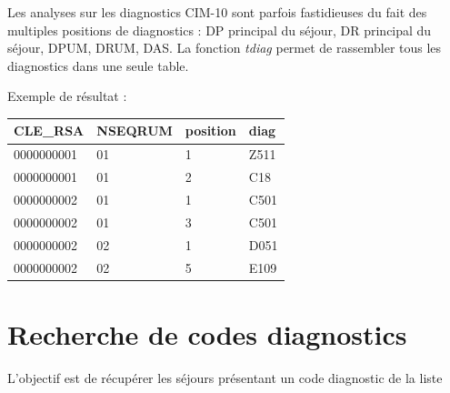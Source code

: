 \documentclass[]{book}
\newenvironment{Shaded}{\begin{snugshade}}{\end{snugshade}}
\newcommand{\CommentTok}[1]{\textcolor[rgb]{0.56,0.35,0.01}{\textit{#1}}}
\newcommand{\KeywordTok}[1]{\textcolor[rgb]{0.13,0.29,0.53}{\textbf{#1}}}
\newcommand{\NormalTok}[1]{#1}
\newcommand{\OperatorTok}[1]{\textcolor[rgb]{0.81,0.36,0.00}{\textbf{#1}}}
\newcommand{\StringTok}[1]{\textcolor[rgb]{0.31,0.60,0.02}{#1}}
\begin{document}
Les analyses sur les diagnostics CIM-10 sont parfois fastidieuses du fait des multiples positions de diagnostics : DP principal du séjour, DR principal du séjour, DPUM, DRUM, DAS. La fonction \emph{tdiag} permet de rassembler tous les diagnostics dans une seule table.

\begin{Shaded}
\end{Shaded}

Exemple de résultat :

\begin{longtable}[]{@{}llll@{}}
\toprule
CLE\_RSA & NSEQRUM & position & diag\tabularnewline
\midrule
\endhead
0000000001 & 01 & 1 & Z511\tabularnewline
0000000001 & 01 & 2 & C18\tabularnewline
0000000002 & 01 & 1 & C501\tabularnewline
0000000002 & 01 & 3 & C501\tabularnewline
0000000002 & 02 & 1 & D051\tabularnewline
0000000002 & 02 & 5 & E109\tabularnewline
\bottomrule
\end{longtable}

\hypertarget{recherche-de-codes-diagnostics}{%
\section{Recherche de codes diagnostics}\label{recherche-de-codes-diagnostics}}

L'objectif est de récupérer les séjours présentant un code diagnostic de la liste
\end{document}
